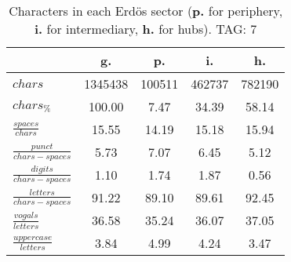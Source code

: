 \begin{table}[h!]
\begin{center}
\begin{tabular}{| l | c | c | c | c |}\hline
 & g. & p. & i. & h. \\\hline
$chars$ & 1345438  & 100511  & 462737  & 782190 \\\hline
$chars_{\%}$ & 100.00  & 7.47  & 34.39  & 58.14 \\\hline
$\frac{spaces}{chars}$ & 15.55  & 14.19  & 15.18  & 15.94 \\\hline
$\frac{punct}{chars-spaces}$ & 5.73  & 7.07  & 6.45  & 5.12 \\\hline
$\frac{digits}{chars-spaces}$ & 1.10  & 1.74  & 1.87  & 0.56 \\\hline
$\frac{letters}{chars-spaces}$ & 91.22  & 89.10  & 89.61  & 92.45 \\\hline
$\frac{vogals}{letters}$ & 36.58  & 35.24  & 36.07  & 37.05 \\\hline
$\frac{uppercase}{letters}$ & 3.84  & 4.99  & 4.24  & 3.47 \\\hline
\end{tabular}
\caption{Characters in each Erd\"os sector ({{\bf p.}} for periphery, {{\bf i.}} for intermediary, 
    {{\bf h.}} for hubs). TAG: 7}
\end{center}
\end{table}